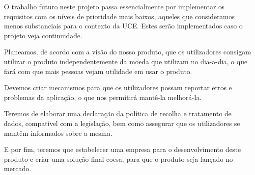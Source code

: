 \documentclass{article}
\begin{document}
    O trabalho futuro neste projeto passa essencialmente por implementar os requisitos com os níveis de prioridade mais baixos, aqueles que consideramos menos substanciais para o contexto da UCE. Estes serão implementados caso o projeto veja continuidade.

    Planeamos, de acordo com a visão do nosso produto, que os utilizadores consigam utilizar o produto independentemente da moeda que utilizam no dia-a-dia, o que fará com que mais pessoas vejam utilidade em usar o produto.

    Devemos criar mecanismos para que os utilizadores possam reportar erros e problemas da aplicação, o que nos permitirá mantê-la melhorá-la.

    Teremos de elaborar uma declaração da política de recolha e tratamento de dados, compatível com a legislação, bem como assegurar que os utilizadores se mantêm informados sobre a mesma.

    E por fim, teremos que estabelecer uma empresa para o desenvolvimento deste produto e criar uma solução final coesa, para que o produto seja lançado no mercado.

    \nocite{*}
    {}
    
\end{document}
